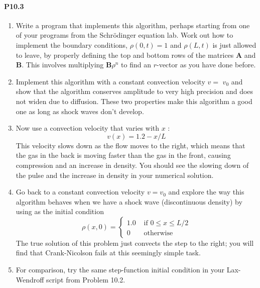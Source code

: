 \paragraph*{P10.3}

\begin{enumerate}[label=(\alph*)]
\item  Write a program that implements this algorithm, perhaps starting from one of your programs from the Schr{\"o}dinger equation lab. Work out how to implement the boundary conditions, $\rho(0, t)=1$ and $\rho(L, t)$ is just allowed to leave, by properly defining the top and bottom rows of the matrices $\mathbf{A}$ and $\mathbf{B}$. This involves multiplying $\mathbf{B} \rho^{n}$ to find an $r$-vector as you have done before.
\item  Implement this algorithm with a constant convection velocity $v=$ $v_{0}$ and show that the algorithm conserves amplitude to very high precision and does not widen due to diffusion. These two properties make this algorithm a good one as long as shock waves don\rq t develop.
\item Now use a convection velocity that varies with $x$ :
\begin{equation}\label{eq:1019}
v(x)=1.2-x / L
\end{equation}
This velocity slows down as the flow moves to the right, which means
that the gas in the back is moving faster than the gas in the front,
causing compression and an increase in density. You should see the
slowing down of the pulse and the increase in density in your numerical solution.
\item Go back to a constant convection velocity $v = v_0$ and explore the way
this algorithm behaves when we have a shock wave (discontinuous
density) by using as the initial condition
\begin{equation}\label{eq:1020}
\rho(x, 0)= \begin{cases}1.0 & \text { if } 0 \leq x \leq L / 2 \\ 0 & \text { otherwise }\end{cases}
\end{equation}
The true solution of this problem just convects the step to the right;
you will find that Crank-Nicolson fails at this seemingly simple task.
\item For comparison, try the same step-function initial condition in your
Lax-Wendroff script from Problem 10.2.
\end{enumerate}
